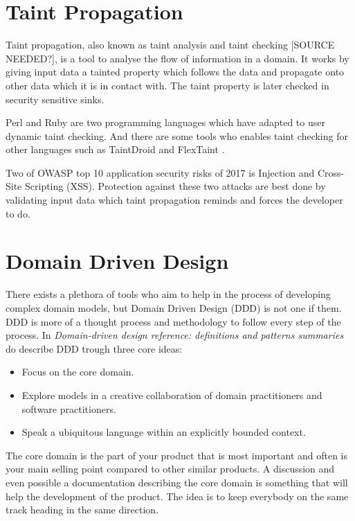 \section{Taint Propagation}
Taint propagation, also known as taint analysis and taint checking [SOURCE NEEDED?], is a tool to analyse the flow of information in a domain. \parencite{Pan2015} It works by giving input data a tainted property which follows the data and propagate onto other data which it is in contact with. The taint property is later checked in security sensitive sinks. \parencite{Pan2015}

Perl and Ruby are two programming languages which have adapted to user dynamic taint checking. \parencite{perl, ruby} And there are some tools who enables taint checking for other languages such as TaintDroid \parencite{Ma2010} and FlexTaint \parencite{Venkataramani2008}.

Two of OWASP top 10 application security risks of 2017 is Injection and Cross-Site Scripting (XSS). \parencite{OWASP2017} Protection against these two attacks are best done by validating input data which taint propagation reminds and forces the developer to do.


\section{Domain Driven Design}
There exists a plethora of tools who aim to help in the process of developing complex domain models, but Domain Driven Design (DDD) is not one if them. \parencite{Bankes, 10.1007/978-3-319-24309-2_33} DDD is more of a thought process and methodology to follow every step of the process. \parencite{EvansEric2004Dd:t} In \emph{Domain-driven design reference: definitions and patterns summaries} do \textcite{evans_2015} describe DDD trough three core ideas:

\begin{itemize}
  \item Focus on the core domain.
  \item Explore models in a creative collaboration of domain practitioners and software practitioners.
  \item Speak a ubiquitous language within an explicitly bounded context.
\end{itemize}

The core domain is the part of your product that is most important and often is your main selling point compared to other similar products. \parencite{millett_2015} A discussion and even possible a documentation describing the core domain is something that will help the development of the product. The idea is to keep everybody on the same track heading in the same direction. \parencite{EvansEric2004Dd:t}

